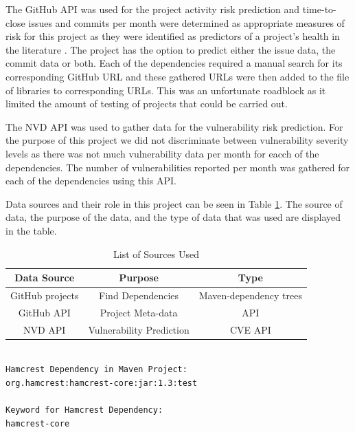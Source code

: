 \documentclass[conference]{IEEEtran}
\begin{document}
The GitHub API was used for the project activity risk prediction and time-to-close issues and commits per month were determined as appropriate measures of risk for this project as they were identified as predictors of a project's health in the literature \cite{xia_predicting_2022}. The project has the option to predict either the issue data, the commit data or both. Each of the dependencies required a manual search for its corresponding GitHub URL and these gathered URLs were then added to the file of libraries to corresponding URLs. This was an unfortunate roadblock as it limited the amount of testing of projects that could be carried out. 

The NVD API was used to gather data for the vulnerability risk prediction. For the purpose of this project we did not discriminate between vulnerability severity levels as there was not much vulnerability data per month for eacch of the dependencies. The number of vulnerabilities reported per month was gathered for each of the dependencies using this API. 

Data sources and their role in this project can be seen in Table \ref{sourcelist}. The source of data, the purpose of the data, and the type of data that was used are displayed in the table. 

\begin{table}
 \caption{List of Sources Used}
\label{sourcelist}
\begin{center}
\begin{tabular}{|c|c|c|}
\hline
    \textbf{Data Source} & \textbf{Purpose} & \textbf{Type} \\ \hline
    GitHub projects & Find Dependencies & Maven-dependency trees \\ \hline
    GitHub API & Project Meta-data & API  \\ \hline
    NVD API & Vulnerability Prediction & CVE API \\ \hline
\end{tabular}
\end{center}
\end{table}

\begin{lstlisting}[caption=Example GitHub extraction]

Hamcrest Dependency in Maven Project:
org.hamcrest:hamcrest-core:jar:1.3:test

Keyword for Hamcrest Dependency:
hamcrest-core

\end{lstlisting}
\end{document}
